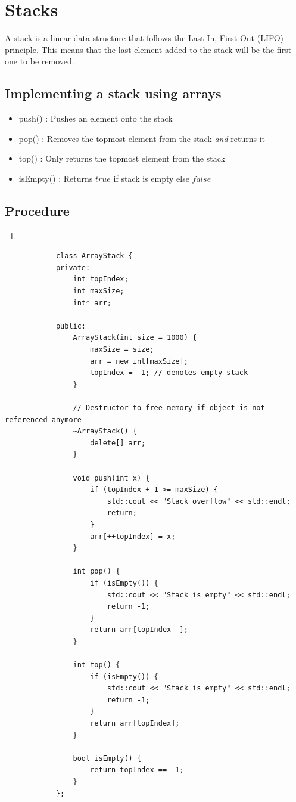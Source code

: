 \documentclass[a4paper, 12pt]{book}
\begin{document}
	\newpage
	\section{Stacks}
	A stack is a linear data structure that follows the Last In, First Out (LIFO) principle. This means that the last element added to the stack will be the first one to be removed.
	\subsection{Implementing a stack using arrays} 
	
	\begin{itemize}
		\item push() : Pushes an element onto the stack
		\item pop() : Removes the topmost element from the stack \emph{and} returns it
		\item {top()} : Only returns the topmost element from the stack 
		\item {isEmpty()} : Returns $true$ if stack is empty else $false$
	\end{itemize}
	\vspace{\baselineskip}
	\subsection{Procedure}
	\begin{enumerate}
		\item 
	\end{enumerate}
	\newpage
	
	\begin{tcolorbox}[title=ArrayStack class]
		\begin{verbatim}
			class ArrayStack {
			private:
				int topIndex;
				int maxSize;
				int* arr;
				
			public:
				ArrayStack(int size = 1000) {
					maxSize = size;
					arr = new int[maxSize];
					topIndex = -1; // denotes empty stack
				}
				
				// Destructor to free memory if object is not referenced anymore
				~ArrayStack() {
					delete[] arr;
				}
				
				void push(int x) {
					if (topIndex + 1 >= maxSize) {
						std::cout << "Stack overflow" << std::endl;
						return;
					}
					arr[++topIndex] = x;
				}
				
				int pop() {
					if (isEmpty()) {
						std::cout << "Stack is empty" << std::endl;
						return -1;
					}
					return arr[topIndex--];
				}
				
				int top() {
					if (isEmpty()) {
						std::cout << "Stack is empty" << std::endl;
						return -1;
					}
					return arr[topIndex];
				}
				
				bool isEmpty() {
					return topIndex == -1;
				}
			};
		\end{verbatim}
	\end{tcolorbox}
	
\end{document}
